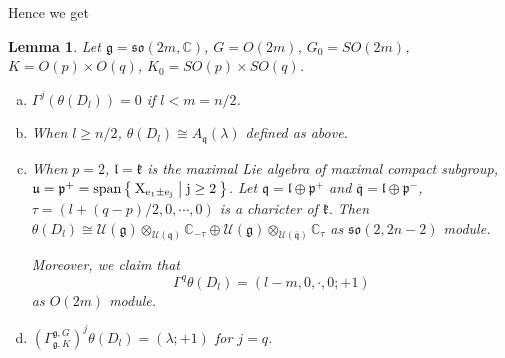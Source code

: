 \documentclass[12pt]{article}
\newtheorem{lemma}{Lemma}
\def\bC{{\mathbb{C}}}
\def\sspan{\rm{span}}
\def\gg{{\mathfrak{g}}}
\def\aso{\mathfrak{so}}
\def\fuu{\mathfrak{u}}
\def\fll{\mathfrak{l}}
\def\fpp{\mathfrak{p}}
\def\fqq{\mathfrak{q}}
\def\fgg{\mathfrak{g}}
\def\fkk{\mathfrak{k}}
\def\cuu{\mathcal{U}}
\begin{document}
Hence we get
\begin{lemma}\label{lemma:derived_D_l}
Let $\fgg = \aso(2m,\bC)$, $G = O(2m)$, $G_0 = SO(2m)$, $K = O(p)\times O(q)$, 
$K_0 = SO(p)\times SO(q)$.  
\begin{enumerate}[a)]
\item $\Gamma^j(\theta(D_l)) = 0$ if $l<m=n/2$.  
\item When $l\geq n/2$, $\theta(D_l)\cong A_\fqq(\lambda)$ defined as above.
\item When $p=2$, $\fll=\fkk$ is the maximal Lie algebra of maximal compact
subgroup, $\fuu =\fpp^+=\sspan\Set{X_{e_1\pm e_j}|j\geq 2}$. Let 
$\fqq=\fll\oplus\fpp^+$ and
$\overline{\fqq}=\fll\oplus\fpp^-$, $\tau= (l+(q-p)/2,0,\cdots, 0)$ is a charicter of $\fkk$. Then
$\theta(D_l)\cong \cuu(\gg)\otimes_{\cuu(\fqq)}\bC_{-\tau}\oplus  \cuu(\gg)\otimes_{\cuu(\overline{\fqq})}\bC_{\tau} $ as $\aso(2,2n-2)$ module.

Moreover, we claim that
\[
\Gamma^q\theta(D_l) = (l-m,0,\cdot, 0; +1) 
\]
as $O(2m)$ module. 
\item $\left(\Gamma_{\fgg,K}^{\fgg,G}\right)^j\theta(D_l) = (\lambda; +1)$ for $j = q$.
\end{enumerate}
\end{lemma}
\proof
\end{document}
